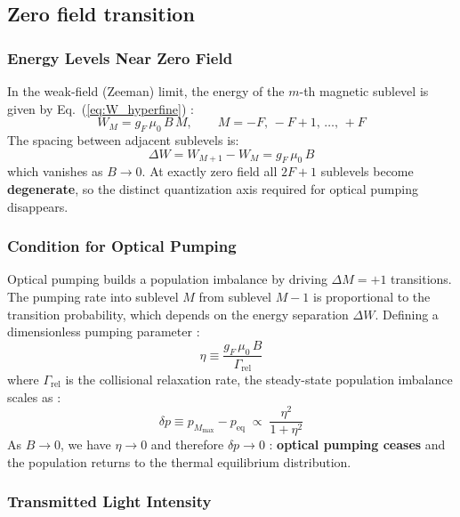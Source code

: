 \subsection{Zero field transition}

\subsubsection*{Energy Levels Near Zero Field}
 
In the weak-field (Zeeman) limit, the energy of the $m$-th magnetic sublevel is given
by Eq.~(\ref{eq:W_hyperfine}) :
\begin{equation}
    W_M = g_F\,\mu_0\,B\,M, \qquad M = -F,\,-F+1,\,\ldots,\,+F
    \label{eq:ZF_energy}
\end{equation}
The spacing between adjacent sublevels is:
\begin{equation}
    \Delta W = W_{M+1} - W_M = g_F\,\mu_0\,B
    \label{eq:ZF_spacing}
\end{equation}
which vanishes as $B \to 0$. At exactly zero field all $2F+1$ sublevels become
\textbf{degenerate}, so the distinct quantization axis required for optical pumping
disappears.
 
\subsubsection*{Condition for Optical Pumping}
 
Optical pumping builds a population imbalance by driving $\Delta M = +1$ transitions.
The pumping rate into sublevel $M$ from sublevel $M-1$ is proportional to the transition
probability, which depends on the energy separation $\Delta W$. Defining a dimensionless
pumping parameter :
\begin{equation}
    \eta \equiv \frac{g_F\,\mu_0\,B}{\Gamma_{\text{rel}}}
    \label{eq:pumping_param}
\end{equation}
where $\Gamma_{\text{rel}}$ is the collisional relaxation rate, the steady-state population
imbalance scales as :
\begin{equation}
    \delta p \equiv p_{M_{\max}} - p_{\text{eq}}
    \;\propto\; \frac{\eta^2}{1 + \eta^2}
    \label{eq:pop_imbalance}
\end{equation}
As $B \to 0$, we have $\eta \to 0$ and therefore $\delta p \to 0$ : \textbf{optical pumping
ceases} and the population returns to the thermal equilibrium distribution.
 
\subsubsection*{Transmitted Light Intensity}
 
